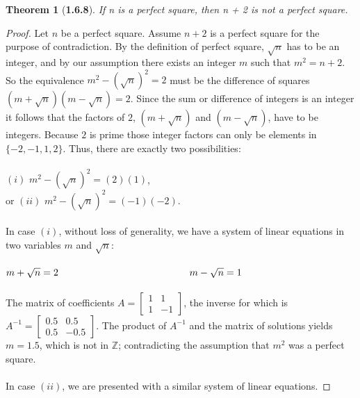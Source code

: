 \documentclass[a4paper, 12pt]{article}
\theoremstyle{plain}
\newtheorem*{theorem*}{Theorem}
\begin{document}
	
\begin{theorem*}[\textbf{1.6.8}]
    If n is a perfect square, then n + 2 is not a perfect square.
\end{theorem*}

\begin{proof}
    Let $n$ be a perfect square. Assume $n + 2$ is a perfect square for the purpose of 
    contradiction. By the definition of perfect square, $\sqrt{n}$ has to be an integer, and 
    by our assumption there exists an integer $m$ such that $m^2 = n + 2$. So the 
    equivalence $m^2 - (\sqrt{n})^2 = 2$ must be the difference of squares 
    $(m + \sqrt{n})(m - \sqrt{n}) = 2$. Since the sum or difference of integers is an integer 
    it follows that the factors of $2$, $(m + \sqrt{n})$ and $(m - \sqrt{n})$, have to be 
    integers. Because $2$ is prime those integer factors can only be elements in 
    $\{-2, -1, 1, 2\}$. Thus, there are exactly two possibilities:
    \\ \\ \indent \indent $(i)$ $m^2 - (\sqrt{n})^2 = (2)(1)$,
    \\ \indent \indent or $(ii)$ $m^2 - (\sqrt{n})^2 = (-1)(-2).$
    \\ \\ In case $(i)$, without loss of generality, we have 
    a system of linear 
    equations in two variables $m$ and $\sqrt{n}$: 
    \\ \\ \indent \indent \indent \indent \indent \indent \indent \indent \indent $m + \sqrt{n} = 2
    \\ \indent \indent \indent \indent \indent \indent \indent \indent \indent m - \sqrt{n} = 1$
    \\ \\
    The matrix of coefficients 
    $A = \left[\begin{smallmatrix}
        1 & 1 \\
        1 & -1 
    \end{smallmatrix}\right]$, the inverse for which is
    $A^{-1} = \left[\begin{smallmatrix}
        0.5 & 0.5 \\
        0.5 & -0.5
    \end{smallmatrix}\right]$. The product of $A^{-1}$ and the matrix of solutions
    yields $m = 1.5$, which is not in $\mathbb{Z}$;
    contradicting the assumption that $m^2$ was a perfect square.
    \\ \\ In case $(ii)$, we are presented with a similar system of linear equations.

\end{proof}
\end{document}
